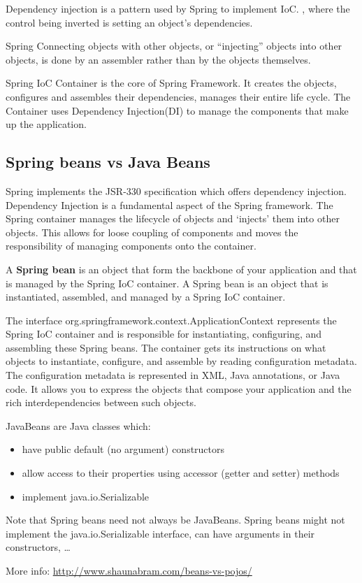 Dependency injection is a pattern used by Spring to implement IoC. , where the control being inverted is setting an object's dependencies.

Spring Connecting objects with other objects, or “injecting” objects into other objects, is done by an assembler rather than by the objects themselves.

Spring IoC Container is the core of Spring Framework. It creates the objects, configures and assembles their dependencies, manages their entire life cycle. The Container uses Dependency Injection(DI) to manage the components that make up the application. 

\subsection{Spring beans vs Java Beans \cite{naming_bean}}

Spring implements the JSR-330 specification which offers dependency injection. 
Dependency Injection is a fundamental aspect of the Spring framework. The Spring container manages the lifecycle of objects and `injects' them into other objects.  
This allows for loose coupling of components and moves the responsibility of managing components onto the container.

A \textbf{Spring bean} is an object that form the backbone of your application and that is managed by the Spring IoC container. A Spring bean is an object that is instantiated, assembled,  and managed by a Spring IoC container. 

The interface org.springframework.context.ApplicationContext represents the Spring IoC container and is responsible for instantiating, configuring, and assembling these Spring beans. The container gets its instructions on what objects to instantiate, configure, and assemble by reading configuration metadata. The configuration metadata is represented in XML, Java annotations, or Java code. It allows you to express the objects that compose your application and the rich interdependencies between such objects.

JavaBeans are Java classes which: 
\begin{itemize}
\item have public default (no argument) constructors
\item allow access to their properties using accessor (getter and setter) methods
\item implement java.io.Serializable
\end{itemize}

Note that Spring beans need not always be JavaBeans. Spring beans might not implement the java.io.Serializable interface, can have arguments in their constructors, \ldots

More info: \url{http://www.shaunabram.com/beans-vs-pojos/}
